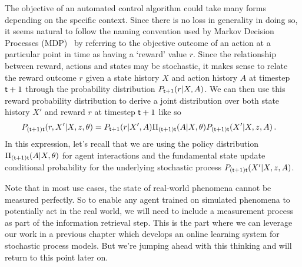 The objective of an automated control algorithm could take many forms depending on the specific context. Since there is no loss in generality in doing so, it seems natural to follow the naming convention used by Markov Decision Processes (MDP)~\cite{bertsekas2011dynamic,sutton2018reinforcement} by referring to the objective outcome of an action at a particular point in time as having a `reward' value $r$. Since the relationship between reward, actions and states may be stochastic, it makes sense to relate the reward outcome $r$ given a state history $X$ and action history $A$ at timestep ${\sf t}+1$ through the probability distribution $P_{{\sf t}+1}(r\vert X,A)$. We can then use this reward probability distribution to derive a joint distribution over both state history $X'$ and reward $r$ at timestep ${\sf t}+1$ like so
\begin{align}
P_{({\sf t}+1){\sf t}}(r,X'\vert X, z,\theta) &= P_{{\sf t}+1}(r\vert X',A)\Pi_{({\sf t}+1){\sf t}}(A\vert X,\theta)P_{({\sf t}+1){\sf t}}(X'\vert X,z,A) \label{eq:joint-x-and-r}\,.
\end{align}
In this expression, let's recall that we are using the policy distribution $\Pi_{({\sf t}+1){\sf t}}(A\vert X,\theta)$ for agent interactions and the fundamental state update conditional probability for the underlying stochastic process $P_{({\sf t}+1){\sf t}}(X'\vert X,z,A)$.

Note that in most use cases, the state of real-world phenomena cannot be measured perfectly. So to enable any agent trained on simulated phenomena to potentially act in the real world, we will need to include a measurement process as part of the information retrieval step. This is the part where we can leverage our work in a previous chapter which develops an online learning system for stochastic process models. But we're jumping ahead with this thinking and will return to this point later on.

